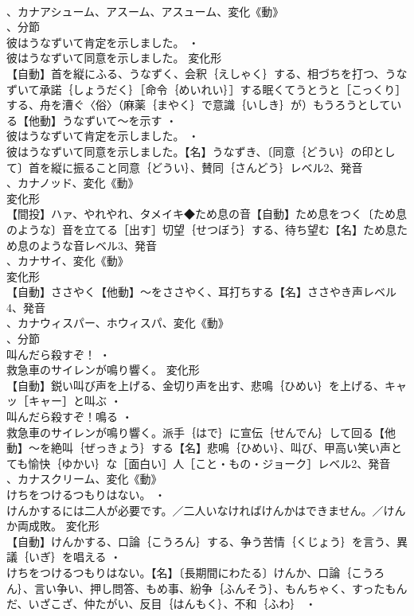 \documentclass[8pt]{extreport}
\begin{document}
\begin{CJK}{UTF8}{min}
\\	、カナアシューム、アスーム、アスューム、変化《動》
\\	、分節
\\	彼はうなずいて肯定を示しました。 ・
\\	彼はうなずいて同意を示しました。	変化形 
\\	【自動】首を縦にふる、うなずく、会釈｛えしゃく｝する、相づちを打つ、うなずいて承諾｛しょうだく｝［命令｛めいれい｝］する眠くてうとうと［こっくり］する、舟を漕ぐ〈俗〉（麻薬｛まやく｝で意識｛いしき｝が）もうろうとしている【他動】うなずいて～を示す ・
\\	彼はうなずいて肯定を示しました。 ・
\\	彼はうなずいて同意を示しました。【名】うなずき、〔同意｛どうい｝の印として〕首を縦に振ること同意｛どうい｝、賛同｛さんどう｝レベル2、発音
\\	、カナノッド、変化《動》
\\	変化形 
\\	【間投】ハァ、やれやれ、タメイキ◆ため息の音【自動】ため息をつく〔ため息のような〕音を立てる［出す］切望｛せつぼう｝する、待ち望む【名】ため息ため息のような音レベル3、発音
\\	、カナサイ、変化《動》
\\	変化形 
\\	【自動】ささやく【他動】～をささやく、耳打ちする【名】ささやき声レベル4、発音
\\	、カナウィスパー、ホウィスパ、変化《動》
\\	、分節
\\	叫んだら殺すぞ！ ・
\\	救急車のサイレンが鳴り響く。	変化形 
\\	【自動】鋭い叫び声を上げる、金切り声を出す、悲鳴｛ひめい｝を上げる、キャッ［キャー］と叫ぶ ・
\\	叫んだら殺すぞ！鳴る ・
\\	救急車のサイレンが鳴り響く。派手｛はで｝に宣伝｛せんでん｝して回る【他動】～を絶叫｛ぜっきょう｝する【名】悲鳴｛ひめい｝、叫び、甲高い笑い声とても愉快｛ゆかい｝な［面白い］人［こと・もの・ジョーク］レベル2、発音
\\	、カナスクリーム、変化《動》
\\	けちをつけるつもりはない。 ・
\\	けんかするには二人が必要です。／二人いなければけんかはできません。／けんか両成敗。	変化形 
\\	【自動】けんかする、口論｛こうろん｝する、争う苦情｛くじょう｝を言う、異議｛いぎ｝を唱える ・
\\	けちをつけるつもりはない。【名】〔長期間にわたる〕けんか、口論｛こうろん｝、言い争い、押し問答、もめ事、紛争｛ふんそう｝、もんちゃく、すったもんだ、いざこざ、仲たがい、反目｛はんもく｝、不和｛ふわ｝ ・

\end{CJK}
\end{document}
